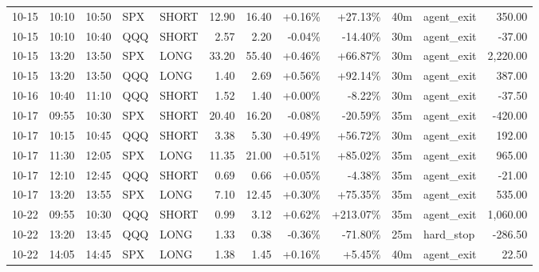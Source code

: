\documentclass[11pt,a4paper,twoside]{article}
\begin{document}
\begin{center}
\begin{longtable}{>{\color{txtmain}}l l l l l r r r r r >{\color{txtmain}}l r}
10-15 & 10:10 & 10:50 & SPX & SHORT & 12.90 & 16.40 & \textcolor{wingreen}{+0.16\%} & \textcolor{wingreen}{+27.13\%} & 40m & agent\_exit & \textcolor{wingreen}{350.00} \\
10-15 & 10:10 & 10:40 & QQQ & SHORT & 2.57 & 2.20 & \textcolor{lossred}{-0.04\%} & \textcolor{lossred}{-14.40\%} & 30m & agent\_exit & \textcolor{lossred}{-37.00} \\
10-15 & 13:20 & 13:50 & SPX & LONG & 33.20 & 55.40 & \textcolor{wingreen}{+0.46\%} & \textcolor{wingreen}{+66.87\%} & 30m & agent\_exit & \textcolor{wingreen}{2,220.00} \\
10-15 & 13:20 & 13:50 & QQQ & LONG & 1.40 & 2.69 & \textcolor{wingreen}{+0.56\%} & \textcolor{wingreen}{+92.14\%} & 30m & agent\_exit & \textcolor{wingreen}{387.00} \\
10-16 & 10:40 & 11:10 & QQQ & SHORT & 1.52 & 1.40 & \textcolor{wingreen}{+0.00\%} & \textcolor{lossred}{-8.22\%} & 30m & agent\_exit & \textcolor{lossred}{-37.50} \\
10-17 & 09:55 & 10:30 & SPX & SHORT & 20.40 & 16.20 & \textcolor{lossred}{-0.08\%} & \textcolor{lossred}{-20.59\%} & 35m & agent\_exit & \textcolor{lossred}{-420.00} \\
10-17 & 10:15 & 10:45 & QQQ & SHORT & 3.38 & 5.30 & \textcolor{wingreen}{+0.49\%} & \textcolor{wingreen}{+56.72\%} & 30m & agent\_exit & \textcolor{wingreen}{192.00} \\
10-17 & 11:30 & 12:05 & SPX & LONG & 11.35 & 21.00 & \textcolor{wingreen}{+0.51\%} & \textcolor{wingreen}{+85.02\%} & 35m & agent\_exit & \textcolor{wingreen}{965.00} \\
10-17 & 12:10 & 12:45 & QQQ & SHORT & 0.69 & 0.66 & \textcolor{wingreen}{+0.05\%} & \textcolor{lossred}{-4.38\%} & 35m & agent\_exit & \textcolor{lossred}{-21.00} \\
10-17 & 13:20 & 13:55 & SPX & LONG & 7.10 & 12.45 & \textcolor{wingreen}{+0.30\%} & \textcolor{wingreen}{+75.35\%} & 35m & agent\_exit & \textcolor{wingreen}{535.00} \\
10-22 & 09:55 & 10:30 & QQQ & SHORT & 0.99 & 3.12 & \textcolor{wingreen}{+0.62\%} & \textcolor{wingreen}{+213.07\%} & 35m & agent\_exit & \textcolor{wingreen}{1,060.00} \\
10-22 & 13:20 & 13:45 & QQQ & LONG & 1.33 & 0.38 & \textcolor{lossred}{-0.36\%} & \textcolor{lossred}{-71.80\%} & 25m & hard\_stop & \textcolor{lossred}{-286.50} \\
10-22 & 14:05 & 14:45 & SPX & LONG & 1.38 & 1.45 & \textcolor{wingreen}{+0.16\%} & \textcolor{wingreen}{+5.45\%} & 40m & agent\_exit & \textcolor{wingreen}{22.50} \\

\end{longtable}
\end{center}
\end{document}

